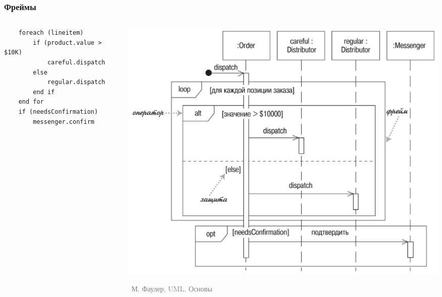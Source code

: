 \documentclass[xetex,mathserif,serif]{beamer}
\newcommand{\attribution}[1] {
	\vspace{-5mm}\begin{flushright}\begin{scriptsize}\textcolor{gray}{\textcopyright\, #1}\end{scriptsize}\end{flushright}
}
\begin{document}
	\begin{frame}[fragile]
		\frametitle{Фреймы}
		\begin{columns}
			\begin{column}{0.5\textwidth}
				\begin{small}
					\begin{verbatim}
    foreach (lineitem)
        if (product.value > $10K)
            careful.dispatch
        else
            regular.dispatch
        end if
    end for
    if (needsConfirmation) 
        messenger.confirm
					\end{verbatim}
				\end{small}
			\end{column}
			\begin{column}{0.5\textwidth}
				\begin{center}
					\includegraphics[width=\textwidth]{sequenceDiagramFrames.png}
					\attribution{М. Фаулер, UML. Основы}
				\end{center}
			\end{column}
		\end{columns}
	\end{frame}
\end{document}
